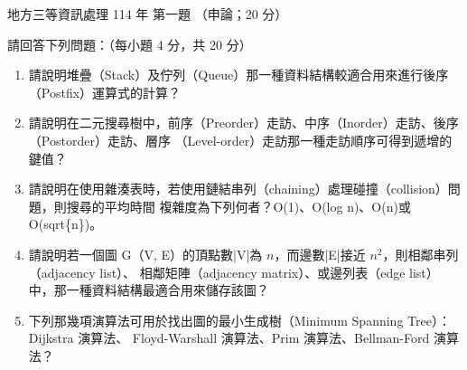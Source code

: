 \begin{pastexam}[label={px:df3-114-ds-01}]{地方三等資訊處理 114 年 第一題}
（申論；20 分）

請回答下列問題：（每小題 4 分，共 20 分）
\begin{enumerate}[leftmargin=2.2em]
\item[㈠] 請說明堆疊（Stack）及佇列（Queue）那一種資料結構較適合用來進行後序（Postfix）運算式的計算？
\item[㈡] 請說明在二元搜尋樹中，前序（Preorder）走訪、中序（Inorder）走訪、後序（Postorder）走訪、層序
（Level-order）走訪那一種走訪順序可得到遞增的鍵值？
\item[㈢] 請說明在使用雜湊表時，若使用鏈結串列（chaining）處理碰撞（collision）問題，則搜尋的平均時間
複雜度為下列何者？O(1)、O(log n)、O(n)或 O(sqrt\{n\})。
\item[㈣] 請說明若一個圖 G（V, E）的頂點數|V|為 $n$，而邊數|E|接近 $n^2$，則相鄰串列（adjacency list）、
相鄰矩陣（adjacency matrix）、或邊列表（edge list）中，那一種資料結構最適合用來儲存該圖？
\item[㈤] 下列那幾項演算法可用於找出圖的最小生成樹（Minimum Spanning Tree）：Dijkstra 演算法、
Floyd-Warshall 演算法、Prim 演算法、Bellman-Ford 演算法？
\end{enumerate}
\end{pastexam}

